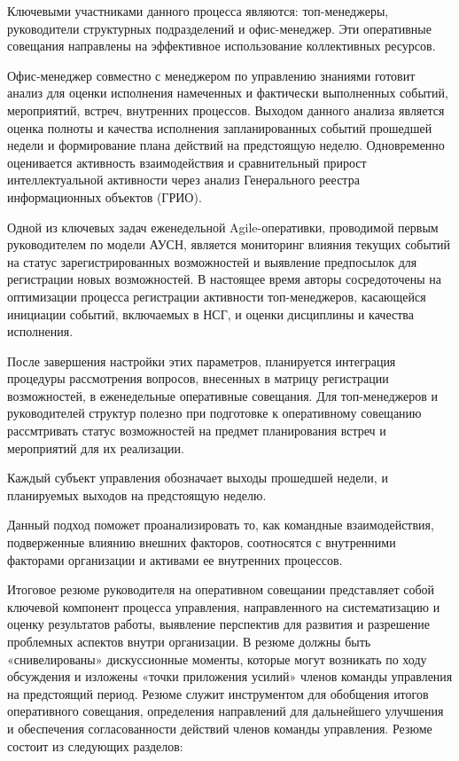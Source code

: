 Ключевыми участниками данного процесса являются: топ-менеджеры,
руководители структурных подразделений и офис-менеджер. Эти оперативные
совещания направлены на эффективное использование коллективных ресурсов.

Офис-менеджер совместно с менеджером по управлению знаниями готовит
анализ для оценки исполнения намеченных и фактически выполненных
событий, мероприятий, встреч, внутренних процессов. Выходом данного
анализа является оценка полноты и качества исполнения запланированных
событий прошедшей недели и формирование плана действий на предстоящую
неделю. Одновременно оценивается активность взаимодействия и
сравнительный прирост интеллектуальной активности через анализ
Генерального реестра информационных объектов (ГРИО).

Одной из ключевых задач еженедельной Agile-оперативки, проводимой первым
руководителем по модели АУСН, является мониторинг влияния текущих
событий на статус зарегистрированных возможностей и выявление
предпосылок для регистрации новых возможностей. В настоящее время авторы
сосредоточены на оптимизации процесса регистрации активности
топ-менеджеров, касающейся инициации событий, включаемых в НСГ, и оценки
дисциплины и качества исполнения.

После завершения настройки этих параметров, планируется интеграция
процедуры рассмотрения вопросов, внесенных в матрицу регистрации
возможностей, в еженедельные оперативные совещания. Для топ-менеджеров и
руководителей структур полезно при подготовке к оперативному совещанию
рассмтривать статус возможностей на предмет планирования встреч и
мероприятий для их реализации.

Каждый субъект управления обозначает выходы прошедшей недели, и
планируемых выходов на предстоящую неделю.

Данный подход поможет проанализировать то, как командные взаимодействия,
подверженные влиянию внешних факторов, соотносятся с внутренними
факторами организации и активами ее внутренних процессов.

Итоговое резюме руководителя на оперативном совещании представляет собой
ключевой компонент процесса управления, направленного на систематизацию
и оценку результатов работы, выявление перспектив для развития и
разрешение проблемных аспектов внутри организации. В резюме должны быть
«снивелированы» дискуссионные моменты, которые могут возникать по ходу
обсуждения и изложены «точки приложения усилий» членов команды
управления на предстоящий период. Резюме служит инструментом для
обобщения итогов оперативного совещания, определения направлений для
дальнейшего улучшения и обеспечения согласованности действий членов
команды управления. Резюме состоит из следующих разделов:

